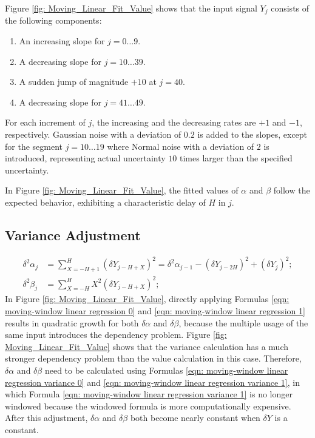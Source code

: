 \documentclass[twoside]{article}
\numberwithin{equation}{section}
\begin{document}
Figure \ref{fig: Moving_Linear_Fit_Value} shows that the input signal $Y_j$ consists of the following components:
\begin{enumerate}
\item An increasing slope for $j = 0 \dots 9$.

\item A decreasing slope for $j = 10 \dots 39$.

\item A sudden jump of magnitude $+10$ at $j=40$.

\item A decreasing slope for $j = 41 \dots 49$.
\end{enumerate}
For each increment of $j$, the increasing and the decreasing rates are $+1$ and $-1$, respectively.
Gaussian noise with a deviation of $0.2$ is added to the slopes, except for the segment $j = 10 \dots 19$ where Normal noise with a deviation of $2$ is introduced, representing actual uncertainty $10$ times larger than the specified uncertainty.

In Figure \ref{fig: Moving_Linear_Fit_Value}, the fitted values of $\alpha$ and $\beta$ follow the expected behavior, exhibiting a characteristic delay of $H$ in $j$.


\subsection{Variance Adjustment}

\begin{align}
\label{eqn: moving-window linear regression variance 0}
\delta^2 \alpha_{j} &= \sum_{X=-H+1}^{H} (\delta Y_{j-H+X})^2 = \delta^2 \alpha_{j-1} - (\delta Y_{j-2H})^2 + (\delta Y_{j})^2; \\
\label{eqn: moving-window linear regression variance 1}
\delta^2 \beta_{j} &= \sum_{X=-H}^{H} X^2 (\delta Y_{j-H+X})^2;
\end{align}
In Figure \ref{fig: Moving_Linear_Fit_Value}, directly applying Formulas \eqref{eqn: moving-window linear regression 0} and \eqref{eqn: moving-window linear regression 1} results in quadratic growth for both $\delta \alpha$ and $\delta \beta$, because the multiple usage of the same input introduces the dependency problem.
Figure \ref{fig: Moving_Linear_Fit_Value} shows that the variance calculation has a much stronger dependency problem than the value calculation in this case.
Therefore, $\delta \alpha$ and $\delta \beta$ need to be calculated using Formulas \eqref{eqn: moving-window linear regression variance 0} and \eqref{eqn: moving-window linear regression variance 1}, in which Formula \eqref{eqn: moving-window linear regression variance 1} is no longer windowed because the windowed formula is more computationally expensive.
After this adjustment, $\delta \alpha$ and $\delta \beta$ both become nearly constant when $\delta Y$ is a constant.
\end{document}
